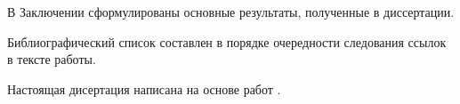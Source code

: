В Заключении сформулированы основные результаты, полученные в диссертации.

Библиографический список составлен в порядке очередности следования ссылок
в тексте работы.

Настоящая дисертация написана на основе работ \cite{K1, K2, K3, K4, K5, K6,
K7, K8, K9, K10, K11}.




